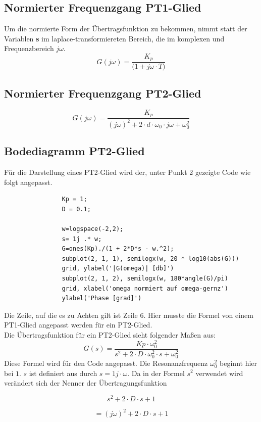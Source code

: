 \documentclass{article}
\begin{document}
		\subsection{Normierter Frequenzgang PT1-Glied}
			Um die normierte Form der Übertragsfunktion zu bekommen, nimmt statt der Variablen \textbf{s} im laplace-transformiereten Bereich, die im komplexen und Frequenzbereich $j\omega$. 
			$$G(j\omega) = \frac{K_p}{\Big(1 + j\omega \cdot T\Big)}$$
\vspace{5mm}		
		\subsection{Normierter Frequenzgang PT2-Glied}
			$$G(j\omega) = \frac{K_p}{(j\omega)^2 + 2\cdot d\cdot \omega_0 \cdot j\omega + \omega_0^2}$$
\vspace{5mm}
		\subsection{Bodediagramm PT2-Glied}
			Für die Darstellung eines PT2-Glied wird der, unter Punkt 2 gezeigte Code wie folgt angepasst.
\vspace{5mm}
			\begin{lstlisting}
				Kp = 1;
				D = 0.1;

				w=logspace(-2,2);
				s= 1j .* w;
				G=ones(Kp)./(1 + 2*D*s - w.^2);
				subplot(2, 1, 1), semilogx(w, 20 * log10(abs(G)))
				grid, ylabel('|G(omega)| [db]')
				subplot(2, 1, 2), semilogx(w, 180*angle(G)/pi)
				grid, xlabel('omega normiert auf omega-gernz')
				ylabel('Phase [grad]')
			\end{lstlisting}
\vspace{5mm}
			Die Zeile, auf die es zu Achten gilt ist Zeile 6. Hier musste die Formel von einem PT1-Glied angepasst werden für ein PT2-Glied. \\
			Die Übertragsfunktion für ein PT2-Glied sieht folgender Maßen aus:
\vspace{5mm}			
			$$G(s) = \frac{Kp \cdot \omega_0^2}{s^2 + 2 \cdot D \cdot \omega_0^2 \cdot s + \omega_0^2}$$
\newpage
			Diese Formel wird für den Code angepasst. Die Resonanzfrequenz $\omega_0^2$ beginnt hier bei $1$. $s$ ist definiert aus durch $s = 1j \cdot \omega$. Da in der Formel $s^2$ verwendet wird verändert sich der Nenner der Übertragungsfunktion

			$$s^2 + 2 \cdot D \cdot s + 1$$

			$$= (j\omega)^2 + 2 \cdot D \cdot s + 1 $$
\end{document}
